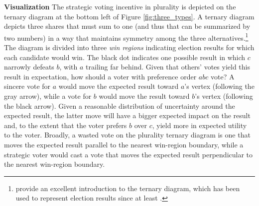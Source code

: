 \documentclass[11pt,a4paper]{article}
\begin{document}
\noindent \textbf{Visualization} The strategic voting incentive in plurality is depicted on the ternary diagram at the bottom left of Figure \ref{fig:three_types}. A ternary diagram depicts three shares that must sum to one (and thus that can be summarized by two numbers) in a way that maintains symmetry among the three alternatives.\footnote{\citet{katz1999statistical} provide an excellent introduction to the ternary diagram, which has been used to represent election results since at least \citet{ibbetsoncomment}.} The diagram is divided into three \emph{win regions} indicating election results for which each candidate would win. The black dot indicates one possible result in which $c$ narrowly defeats $b$, with $a$ trailing far behind. Given that others' votes yield this result in expectation, how should a voter with preference order $abc$ vote? A sincere vote for $a$ would move the expected result toward $a$'s vertex (following the gray arrow), while a vote for $b$ would move the result toward $b$'s vertex (following the black arrow). Given a reasonable distribution of uncertainty around the expected result, the latter move will have a bigger expected impact on the result and, to the extent that the voter prefers $b$ over $c$, yield more in expected utility to the voter. Broadly, a wasted vote on the plurality ternary diagram is one that moves the expected result parallel to the nearest win-region boundary, while a strategic voter would cast a vote that moves the expected result perpendicular to the nearest win-region boundary.\\ 
\end{document}
